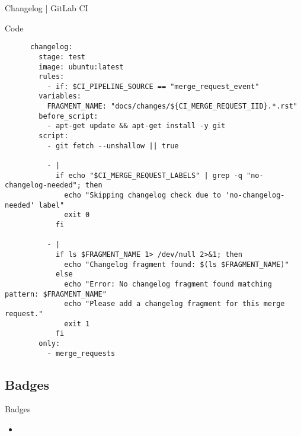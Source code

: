 \begin{frame}[fragile]{Changelog | GitLab CI}
  \begin{block}{Code}
    \scriptsize
    \begin{verbatim}
      changelog:
        stage: test
        image: ubuntu:latest
        rules:
          - if: $CI_PIPELINE_SOURCE == "merge_request_event"
        variables:
          FRAGMENT_NAME: "docs/changes/${CI_MERGE_REQUEST_IID}.*.rst"
        before_script:
          - apt-get update && apt-get install -y git
        script:
          - git fetch --unshallow || true
          
          - |
            if echo "$CI_MERGE_REQUEST_LABELS" | grep -q "no-changelog-needed"; then
              echo "Skipping changelog check due to 'no-changelog-needed' label"
              exit 0
            fi
          
          - |
            if ls $FRAGMENT_NAME 1> /dev/null 2>&1; then
              echo "Changelog fragment found: $(ls $FRAGMENT_NAME)"
            else
              echo "Error: No changelog fragment found matching pattern: $FRAGMENT_NAME"
              echo "Please add a changelog fragment for this merge request."
              exit 1
            fi
        only:
          - merge_requests
     \end{verbatim}
   \end{block}
\end{frame}

\subsection{Badges}
\begin{frame}[fragile]{Badges}
  \begin{itemize}
    \item 
  \end{itemize}
\end{frame}

